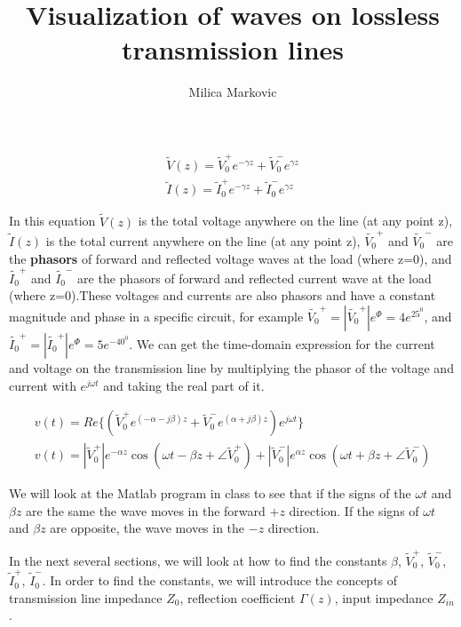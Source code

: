 \documentclass{ximera}
\title{Visualization of waves on lossless  transmission lines}
\author{Milica Markovic}
\begin{document}
  
\begin{abstract}  

\end{abstract}  
\maketitle    


\begin{eqnarray}
\tilde{V}(z)=\tilde{V}_0^+ e^{-\gamma z} + \tilde{V}_0^- e^{\gamma z} \nonumber \\ \nonumber
\tilde{I}(z)=\tilde{I}_0^+ e^{-\gamma z} + \tilde{I}_0^- e^{\gamma z}
\end{eqnarray}

In this equation $\tilde{V}(z)$ is the total voltage anywhere on the line (at any point z), $\tilde{I}(z)$ is the total current anywhere on the line (at any point z), $\tilde{V_0}^+$ and $\tilde{V_0}^-$ are the {\bf
phasors} of forward and
reflected voltage waves at the load (where z=0), and $\tilde{I_0}^+$ and $\tilde{I_0}^-$ are the phasors of forward and
reflected current wave at the load (where z=0).These voltages and currents are also phasors and have a constant magnitude and phase in a specific circuit, for example $\tilde{V_0}^+=|\tilde{V_0}^+| e^\Phi=4e^{25^0}$, and $\tilde{I_0}^+=|\tilde{I_0}^+| e^\Phi=5e^{-40^0}$.
We can get the time-domain expression for the current and voltage on the
transmission line by multiplying the phasor of the voltage and current with $e^{j \omega t}$ and taking the real part of it.

\begin{eqnarray}
v(t)=Re\{ (\tilde{V}_0^+  e^{(-\alpha - j \beta) z} + \tilde{V}_0^- e^{(\alpha + j
 \beta) z})e^{j \omega t} \}  \nonumber \\ 
v(t)=|\tilde{V}_0^+| e^{ - \alpha z} \cos(\omega t - \beta z + \angle \tilde{V}_0^+)+
|\tilde{V}_0^-|e^{\alpha z} \cos(\omega t + \beta z + \angle \tilde{V}_0^-) \label{tdeq}
\end{eqnarray}

We will look at the Matlab program in class to see that if the signs of the $\omega t$ and
$\beta z$ are the same the wave moves in the forward $+z$
direction. If the signs of $\omega t$ and $\beta z$ are opposite, the
wave moves in the $-z$ direction.

In the next several sections, we will look at how to find the constants $\beta$, $\tilde{V}_0^+  $, $ \tilde{V}_0^-$, $\tilde{I}_0^+ $, $\tilde{I}_0^-$. In order to find the constants, we will introduce the concepts of transmission line impedance $Z_0$, reflection coefficient $\Gamma(z)$, input impedance $Z_{in}$. 
\end{document}
